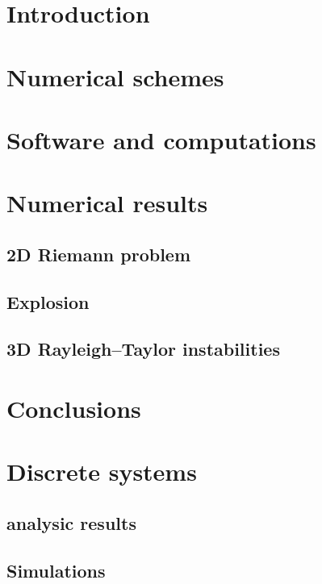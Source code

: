 





\section{Introduction}
  
  
\section{Numerical schemes}
  

\section{Software and computations}
  
 \section{Numerical results}
 
 \subsection{2D Riemann problem}
 
  \subsection{Explosion}
 
  \subsection{3D Rayleigh–Taylor instabilities}
  
	\section{Conclusions}
	
  
 
  
\section{Discrete systems}
  
  \subsection{analysic results}
  
  \subsection{Simulations}
	

